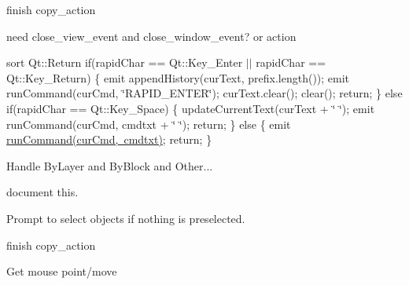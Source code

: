 \begin{DoxyRefList}
%
finish copy\+\_\+action  
\item[Member \mbox{\hyperlink{imgui__main_8c_a46c4ffe394ae864ae88bdba585993c38}{close\+\_\+event}} (int $\ast$event)]\label{todo__todo000019}%
%
need close\+\_\+view\+\_\+event and close\+\_\+window\+\_\+event? or action  
\item[Member \mbox{\hyperlink{class_cmd_prompt_input_ab44f78b31931ea15fb5729c6491512ed}{Cmd\+Prompt\+Input\+::process\+Input}} (const QChar \&rapid\+Char=QChar())]\label{todo__todo000001}%
%
sort Qt\+::\+Return if(rapid\+Char == Qt\+::\+Key\+\_\+\+Enter $\vert$$\vert$ rapid\+Char == Qt\+::\+Key\+\_\+\+Return) \{ emit append\+History(cur\+Text, prefix.\+length()); emit run\+Command(cur\+Cmd, \char`\"{}\+RAPID\+\_\+\+ENTER\char`\"{}); cur\+Text.\+clear(); clear(); return; \} else if(rapid\+Char == Qt\+::\+Key\+\_\+\+Space) \{ update\+Current\+Text(cur\+Text + \char`\"{} \char`\"{}); emit run\+Command(cur\+Cmd, cmdtxt + \char`\"{} \char`\"{}); return; \} else \{ emit \mbox{\hyperlink{class_cmd_prompt_input_aa506049eb78e7b035aa76af84f4ffcef}{run\+Command(cur\+Cmd, cmdtxt)}}; return; \}  
\item[Member \mbox{\hyperlink{imgui__main_8c_a152aab1306f180696e3304162009b6f7}{color\+Selector\+Index\+Changed}} (int index)]\label{todo__todo000174}%
%
Handle By\+Layer and By\+Block and Other...  
\item[Member \mbox{\hyperlink{imgui__main_8c_a2627a7999cd23d611de62da7205c82c0}{context\+\_\+menu\+\_\+event}} (void)]\label{todo__todo000050}%
%
document this.  
\item[Member \mbox{\hyperlink{imgui__main_8c_af07789864af2722ae9651aa41209d4ee}{copy}} (void)]\label{todo__todo000055}%
%
Prompt to select objects if nothing is preselected.  
\item[Member \mbox{\hyperlink{imgui__main_8c_ac2c076c4fbd19adc76e5400806450cee}{copy\+\_\+action}} (void)]\label{todo__todo000107}%
%
finish copy\+\_\+action  
\item[Member \mbox{\hyperlink{imgui__main_8c_aad92db755b8d2d546ba1a91ea4f01cad}{copy\+\_\+selected}} (void)]\label{todo__todo000157}%
%
Get mouse point/move  
\item[Member \mbox{\hyperlink{main_8c_a5d7bf5f964ae87921bab916b871ea2dd}{copy\+\_\+trim}} (char const $\ast$s)]\label{todo__todo000251}%
$$
\end{DoxyRefList}
